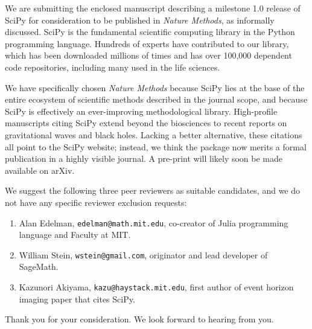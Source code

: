 \documentclass[10pt,stdletter,dateno]{newlfm}
\begin{document}
\begin{newlfm}

We are submitting the enclosed manuscript describing a milestone
1.0 release of SciPy for consideration to be published in
\emph{Nature Methods}, as informally discussed.
SciPy is the fundamental scientific 
computing library in the Python programming language. 
Hundreds of experts have contributed to our library, which
has been downloaded millions of times and has over 100,000 dependent
code repositories, including many used in the life sciences.

We have specifically chosen \emph{Nature Methods} because
SciPy lies at the base of the entire ecosystem of scientific methods
described in the journal scope, and because SciPy is effectively an
ever-improving methodological library. High-profile manuscripts citing SciPy 
extend beyond the biosciences to recent reports on gravitational waves and
black holes. Lacking a better alternative, these citations all point
to the SciPy website; instead, we think the package now merits a
formal publication in a highly visible journal. A pre-print will likely
soon be made available on arXiv.

We suggest the following three peer reviewers as suitable candidates,
and we do not have any specific reviewer exclusion requests:

\begin{enumerate}
    \item Alan Edelman, \texttt{edelman@math.mit.edu}, co-creator of Julia
    programming language and Faculty at MIT.
    \item William Stein, \texttt{wstein@gmail.com}, originator and
    lead developer of SageMath.
    \item Kazunori Akiyama, \texttt{kazu@haystack.mit.edu}, first author
    of event horizon imaging paper that cites SciPy.
\end{enumerate}

Thank you for your consideration.  We look forward to
    hearing from you.\vspace*{0.1cm}
\end{newlfm}
\end{document}
